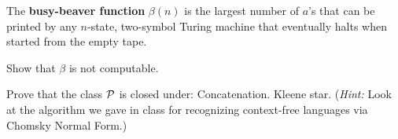 \documentclass[solution, letterpaper]{cs121}
\begin{document}
The {\bf busy-beaver function}
$\beta(n)$ is
the largest number of $a$'s that can be printed by any $n$-state, two-symbol Turing machine that eventually halts when started from the empty tape.

Show that $\beta$ is not computable. 

\begin{solution}
\end{solution}


Prove that the class ${\cal P}$ is closed under:
\subproblem Concatenation.
\subproblem Kleene star. (\emph{Hint:} Look at the algorithm we gave in class for recognizing context-free languages via Chomsky Normal Form.)
\end{document}
